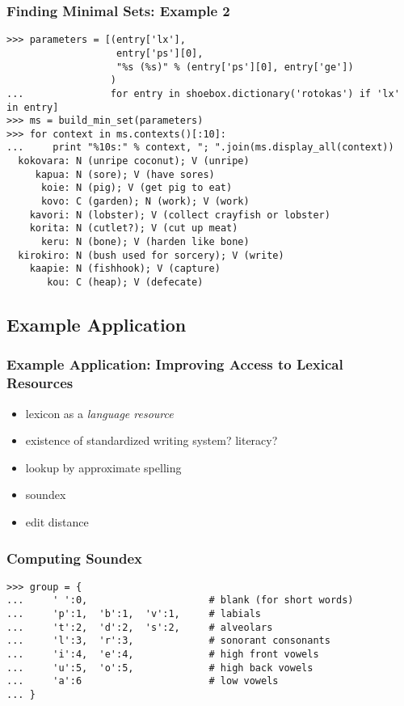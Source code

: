 \documentclass{beamer}
\begin{document}
\begin{frame}[fragile]
\frametitle{Finding Minimal Sets: Example 2}
\scriptsize

\begin{verbatim}
>>> parameters = [(entry['lx'],
                   entry['ps'][0],
                   "%s (%s)" % (entry['ps'][0], entry['ge'])
                  )
...               for entry in shoebox.dictionary('rotokas') if 'lx' in entry]
>>> ms = build_min_set(parameters)
>>> for context in ms.contexts()[:10]:
...     print "%10s:" % context, "; ".join(ms.display_all(context))
  kokovara: N (unripe coconut); V (unripe)
     kapua: N (sore); V (have sores)
      koie: N (pig); V (get pig to eat)
      kovo: C (garden); N (work); V (work)
    kavori: N (lobster); V (collect crayfish or lobster)
    korita: N (cutlet?); V (cut up meat)
      keru: N (bone); V (harden like bone)
  kirokiro: N (bush used for sorcery); V (write)
    kaapie: N (fishhook); V (capture)
       kou: C (heap); V (defecate)
\end{verbatim}
\end{frame}

\subsection{Example Application}

\begin{frame}
\frametitle{Example Application: Improving Access to Lexical Resources}
\begin{itemize}
\item lexicon as a \textit{language resource}
\item existence of standardized writing system?  literacy?
\item lookup by approximate spelling
\item soundex
\item edit distance
\end{itemize}
\end{frame}

\begin{frame}[fragile]
\frametitle{Computing Soundex}
\small

\begin{verbatim}
>>> group = {
...     ' ':0,                     # blank (for short words)
...     'p':1,  'b':1,  'v':1,     # labials
...     't':2,  'd':2,  's':2,     # alveolars
...     'l':3,  'r':3,             # sonorant consonants
...     'i':4,  'e':4,             # high front vowels
...     'u':5,  'o':5,             # high back vowels
...     'a':6                      # low vowels
... }
\end{verbatim}
\end{frame}
\end{document}
